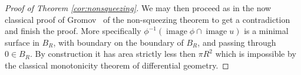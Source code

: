 \documentclass{amsart}
\numberwithin{equation}{section}
\theoremstyle{definition}
\theoremstyle{remark}
\DeclareMathOperator{\image}{\mathrm{image}}
\DeclareMathOperator{\lcs}{lcs}
\begin{document}
\begin{proof} [Proof of Theorem \ref{cor:nonsqueezing}]
  We may then proceed as in the now classical proof of Gromov~\cite{citeGromovPseudoholomorphiccurvesinsymplecticmanifolds.} of the non-squeezing theorem to get a contradiction and finish the proof.  More specifically $\phi ^{-1} ({\image \phi \cap \image u})  $ is a  minimal surface in $B _{R}  $, with boundary on the boundary of $B _{R} $, and passing through $0 \in B _{R} $. By construction it has area strictly less then $\pi R ^{2} $ which is impossible by the classical monotonicity theorem of differential geometry.
\end{proof} 
%
\end{document}
